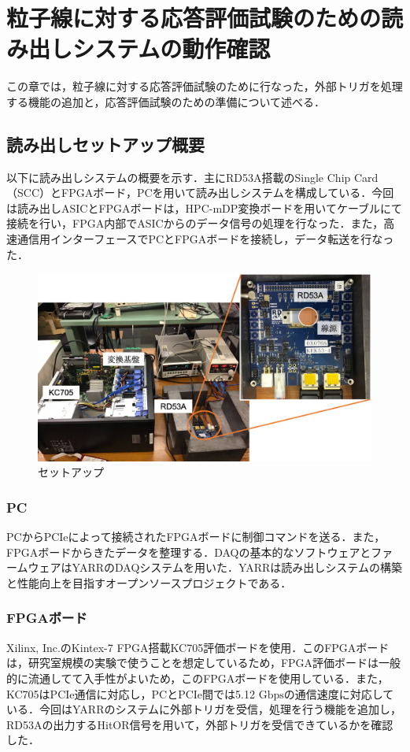 \chapter{粒子線に対する応答評価試験のための読み出しシステムの動作確認}
この章では，粒子線に対する応答評価試験のために行なった，外部トリガを処理する機能の追加と，応答評価試験のための準備について述べる．

\section{読み出しセットアップ概要}
以下に読み出しシステムの概要を示す．主にRD53A搭載のSingle Chip Card（SCC）とFPGAボード，PCを用いて読み出しシステムを構成している．今回は読み出しASICとFPGAボードは，HPC-mDP変換ボードを用いてケーブルにて接続を行い，FPGA内部でASICからのデータ信号の処理を行なった．また，高速通信用インターフェースでPCとFPGAボードを接続し，データ転送を行なった．\\


\begin{figure}[h]
  \centering
  \includegraphics[width=15cm]{./figure/Setup.png}
  \caption{セットアップ}
  \label{fig:setup}
\end{figure}


\subsection*{PC}
PCからPCIeによって接続されたFPGAボードに制御コマンドを送る．また，FPGAボードからきたデータを整理する．DAQの基本的なソフトウェアとファームウェアはYARRのDAQシステムを用いた．YARRは読み出しシステムの構築と性能向上を目指すオープンソースプロジェクトである．

\subsection*{FPGAボード}
Xilinx, Inc.のKintex-7 FPGA搭載KC705評価ボードを使用．このFPGAボードは，研究室規模の実験で使うことを想定しているため，FPGA評価ボードは一般的に流通してて入手性がよいため，このFPGAボードを使用している．また，KC705はPCIe通信に対応し，PCとPCIe間では5.12 $\mathrm{Gbps}$の通信速度に対応している．今回はYARRのシステムに外部トリガを受信，処理を行う機能を追加し，RD53Aの出力するHitOR信号を用いて，外部トリガを受信できているかを確認した．

